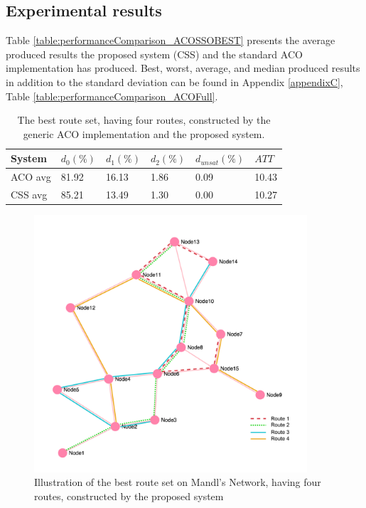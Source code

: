 \subsection{Experimental results}
\label{subsec:performanceComparison_results}


Table \vref{table:performanceComparison_ACOSSOBEST} presents the average produced results the proposed system (CSS) and the standard ACO implementation has produced. Best, worst, average, and median produced results in addition to the standard deviation can be found in Appendix \ref{appendixC}, Table \vref{table:performanceComparison_ACOFull}.

    \begin{table}[H]
    \centering
    \begin{tabular}{|l|l|l|l|l|l|}
    \hline
    \textbf{System} & \textbf{$d_0(\%)$} & \textbf{$d_1(\%)$} & \textbf{$d_2(\%)$} & \textbf{$d_{unsat}(\%)$} & \textbf{$ATT$} \\
    \hline
    ACO avg & 81.92 & 16.13 & 1.86 & 0.09 & 10.43\\
    \hline
    CSS avg & 85.21 & 13.49 & 1.30 & 0.00 & 10.27\\
    \hline
    \end{tabular}
    \caption {The best route set, having four routes, constructed by the generic ACO implementation and the proposed system.}
    \label{table:performanceComparison_ACOSSOBEST}
    \end{table}

   

\begin{figure}[H]
    \begin{center}
    \includegraphics[width=4in]{assets/mandlnetwork_4routes.png}
    \end{center}
    \caption{Illustration of the best route set on Mandl's Network, having four routes, constructed by the proposed system}
    \label{fig:bestRouteSet4} 
\end{figure}

